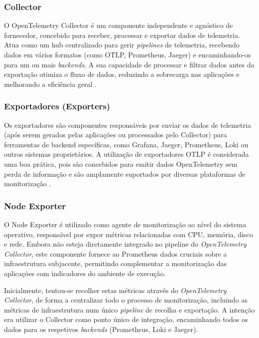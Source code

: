 \subsubsection{Collector}
O OpenTelemetry Collector é um componente independente e agnóstico de fornecedor, concebido para receber, processar e exportar dados de telemetria. Atua como um hub centralizado para gerir \textit{pipelines} de telemetria, recebendo dados em vários formatos (como OTLP, Prometheus, Jaeger) e encaminhando-os para um ou mais \textit{backends}. A sua capacidade de processar e filtrar dados antes da exportação otimiza o fluxo de dados, reduzindo a sobrecarga nas aplicações e melhorando a eficiência geral \cite{opentelemetry_docs,Thakur2022}.

\subsubsection{Exportadores (Exporters)}
Os exportadores são componentes responsáveis por enviar os dados de telemetria (após serem gerados pelas aplicações ou processados pelo Collector) para ferramentas de backend específicas, como Grafana, Jaeger, Prometheus, Loki ou outros sistemas proprietários. A utilização de exportadores OTLP é considerada uma boa prática, pois são concebidos para emitir dados OpenTelemetry sem perda de informação e são amplamente suportados por diversas plataformas de monitorização \cite{opentelemetry_docs,Thakur2022}.

\clearpage

\subsubsection{Node Exporter}
O Node Exporter é utilizado como agente de monitorização ao nível do sistema operativo, responsável por expor métricas relacionadas com CPU, memória, disco e rede. Embora não esteja diretamente integrado no pipeline do \textit{OpenTelemetry Collector}, este componente fornece ao Prometheus dados cruciais sobre a infraestrutura subjacente, permitindo complementar a monitorização das aplicações com indicadores do ambiente de execução.

Inicialmente, tentou-se recolher estas métricas através do \textit{OpenTelemetry Collector}, de forma a centralizar todo o processo de monitorização, incluindo as métricas de infraestrutura num único \textit{pipeline} de recolha e exportação. A intenção era utilizar o Collector como ponto único de integração, encaminhando todos os dados para os respetivos \textit{backends} (Prometheus, Loki e Jaeger).

